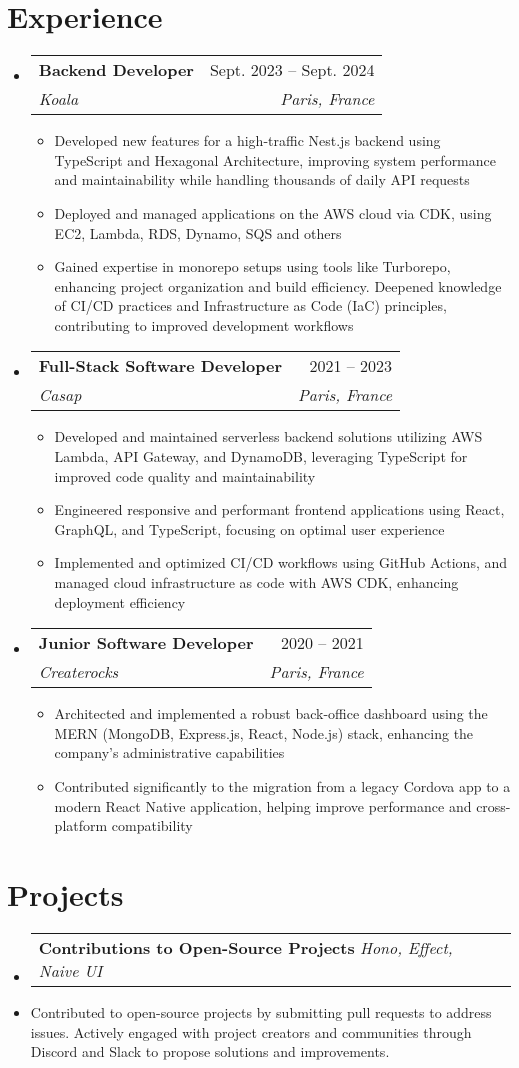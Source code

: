 \documentclass[letterpaper,11pt]{article}
\makeatletter
\newcommand{\resumeItem}[1]{
  \item\small{
    {#1 \vspace{-2pt}}
  }
}
\newcommand{\resumeSubheading}[4]{
  \vspace{-2pt}\item
    \begin{tabular*}{0.97\textwidth}[t]{l@{\extracolsep{\fill}}r}
      \textbf{#1} & #2 \\
      \textit{\small#3} & \textit{\small #4} \\
    \end{tabular*}\vspace{-7pt}
}
\newcommand{\resumeProjectHeading}[2]{
    \item
    \begin{tabular*}{0.97\textwidth}{l@{\extracolsep{\fill}}r}
      \small#1 & #2 \\
    \end{tabular*}\vspace{-7pt}
}
\newcommand{\resumeSubHeadingListStart}{\begin{itemize}[leftmargin=0.15in, label={}]}
\newcommand{\resumeSubHeadingListEnd}{\end{itemize}}
\newcommand{\resumeItemListStart}{\begin{itemize}}
\newcommand{\resumeItemListEnd}{\end{itemize}\vspace{-5pt}}
\makeatother
\begin{document}
\section{Experience}
  \resumeSubHeadingListStart

    \resumeSubheading
      {Backend Developer}{Sept. 2023 -- Sept. 2024}
      {Koala}{Paris, France}
      \resumeItemListStart
        \resumeItem{Developed new features for a high-traffic Nest.js backend using TypeScript and Hexagonal Architecture, improving system performance and maintainability while handling thousands of daily API requests}
        \resumeItem{Deployed and managed applications on the AWS cloud via CDK, using EC2, Lambda, RDS, Dynamo, SQS and others}
        \resumeItem{Gained expertise in monorepo setups using tools like Turborepo, enhancing project organization and build efficiency. Deepened knowledge of CI/CD practices and Infrastructure as Code (IaC) principles, contributing to improved development workflows}
      \resumeItemListEnd

    \resumeSubheading
      {Full-Stack Software Developer}{2021 -- 2023}
      {Casap}{Paris, France}
      \resumeItemListStart
      \resumeItem{Developed and maintained serverless backend solutions utilizing AWS Lambda, API Gateway, and DynamoDB, leveraging TypeScript for improved code quality and maintainability}
      \resumeItem{Engineered responsive and performant frontend applications using React, GraphQL, and TypeScript, focusing on optimal user experience}
      \resumeItem{Implemented and optimized CI/CD workflows using GitHub Actions, and managed cloud infrastructure as code with AWS CDK, enhancing deployment efficiency}
    \resumeItemListEnd

    \resumeSubheading
      {Junior Software Developer}{2020 -- 2021}
      {Createrocks}{Paris, France}
      \resumeItemListStart
        \resumeItem{Architected and implemented a robust back-office dashboard using the MERN (MongoDB, Express.js, React, Node.js) stack, enhancing the company's administrative capabilities}
        \resumeItem{Contributed significantly to the migration from a legacy Cordova app to a modern React Native application, helping improve performance and cross-platform compatibility}
      \resumeItemListEnd

  \resumeSubHeadingListEnd

\section{Projects}
    \resumeSubHeadingListStart
      \resumeProjectHeading
          {\textbf{Contributions to Open-Source Projects} \emph{Hono, Effect, Naive UI} }{}
          \resumeItem{Contributed to open-source projects by submitting pull requests to address issues. Actively engaged with project creators and communities through Discord and Slack to propose solutions and improvements.}
    \resumeSubHeadingListEnd
\end{document}
